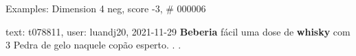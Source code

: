 \begin{frame}{Examples: Dimension 4 neg, score -3, \# 000006}
\footnotesize
\begin{alertblock}{text: t078811, user: luandj20, 2021-11-29}
\textbf{Beberia} fácil uma dose de \textbf{whisky} com 3 Pedra de gelo naquele 
copão esperto. . .  \textbf{} 
\end{alertblock}
\end{frame}
